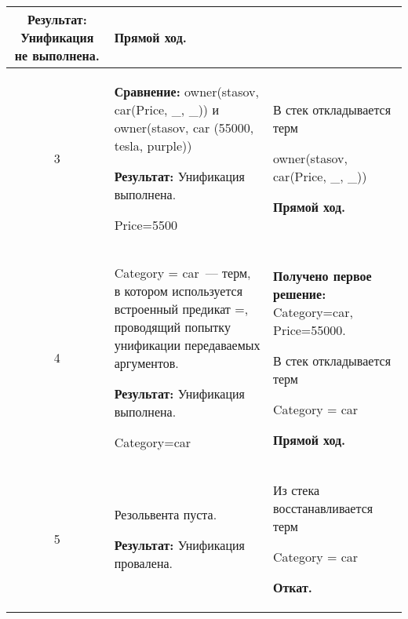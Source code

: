 \begin{longtable}{|c|p{}|p{}|}
  \textbf{Результат:}\newline
  Унификация не выполнена.
                       &
  \textbf{Прямой ход.}
                       \\ \hline

3
                       &
\textbf{Сравнение:}\newline
  owner(stasov, car(Price, \_, \_))
  \newline{}и\newline
  owner(stasov, car     (55000,    tesla,    purple))
  \newline

  \textbf{Результат:}\newline
  Унификация выполнена.

  Price=5500
                       &
  В стек откладывается терм

  owner(stasov, car(Price, \_, \_))
  \newline

  \textbf{Прямой ход.}
                       \\ \hline

4
                       &
  Category = car~--- терм, в котором используется встроенный предикат =, проводящий попытку унификации передаваемых аргументов.
  \newline

  \textbf{Результат:}\newline
  Унификация выполнена.

  Category=car
                       &
  \textbf{Получено первое решение:}\newline
  Category=car, Price=55000.
  \newline

  В стек откладывается терм

  Category = car
  \newline

  \textbf{Прямой ход.}
                       \\ \hline

5
                       &
  Резольвента пуста.

  \textbf{Результат:}\newline
  Унификация провалена.
                       &
  Из стека восстанавливается терм

  Category = car
  \newline

  \textbf{Откат.}
                       \\ \hline


\end{longtable}
